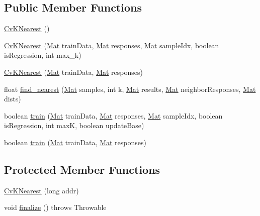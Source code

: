 \subsection*{Public Member Functions}
\begin{DoxyCompactItemize}
\item 
\mbox{\hyperlink{classorg_1_1opencv_1_1ml_1_1_cv_k_nearest_af6d22d07534fa138fbf3c2279bbe8300}{Cv\+K\+Nearest}} ()
\item 
\mbox{\hyperlink{classorg_1_1opencv_1_1ml_1_1_cv_k_nearest_aaf56327cf25a554fcabadbd32b5e5622}{Cv\+K\+Nearest}} (\mbox{\hyperlink{classorg_1_1opencv_1_1core_1_1_mat}{Mat}} train\+Data, \mbox{\hyperlink{classorg_1_1opencv_1_1core_1_1_mat}{Mat}} responses, \mbox{\hyperlink{classorg_1_1opencv_1_1core_1_1_mat}{Mat}} sample\+Idx, boolean is\+Regression, int max\+\_\+k)
\item 
\mbox{\hyperlink{classorg_1_1opencv_1_1ml_1_1_cv_k_nearest_a0971b80fa2de3df95ba0b87efd8dbb9a}{Cv\+K\+Nearest}} (\mbox{\hyperlink{classorg_1_1opencv_1_1core_1_1_mat}{Mat}} train\+Data, \mbox{\hyperlink{classorg_1_1opencv_1_1core_1_1_mat}{Mat}} responses)
\item 
float \mbox{\hyperlink{classorg_1_1opencv_1_1ml_1_1_cv_k_nearest_a43433439f169e81fb05a101e84e3ed57}{find\+\_\+nearest}} (\mbox{\hyperlink{classorg_1_1opencv_1_1core_1_1_mat}{Mat}} samples, int k, \mbox{\hyperlink{classorg_1_1opencv_1_1core_1_1_mat}{Mat}} results, \mbox{\hyperlink{classorg_1_1opencv_1_1core_1_1_mat}{Mat}} neighbor\+Responses, \mbox{\hyperlink{classorg_1_1opencv_1_1core_1_1_mat}{Mat}} dists)
\item 
boolean \mbox{\hyperlink{classorg_1_1opencv_1_1ml_1_1_cv_k_nearest_aeba1551faef0374791568c47fdb253ac}{train}} (\mbox{\hyperlink{classorg_1_1opencv_1_1core_1_1_mat}{Mat}} train\+Data, \mbox{\hyperlink{classorg_1_1opencv_1_1core_1_1_mat}{Mat}} responses, \mbox{\hyperlink{classorg_1_1opencv_1_1core_1_1_mat}{Mat}} sample\+Idx, boolean is\+Regression, int maxK, boolean update\+Base)
\item 
boolean \mbox{\hyperlink{classorg_1_1opencv_1_1ml_1_1_cv_k_nearest_a0d82009c9e1e9a4c327e354bca6a1347}{train}} (\mbox{\hyperlink{classorg_1_1opencv_1_1core_1_1_mat}{Mat}} train\+Data, \mbox{\hyperlink{classorg_1_1opencv_1_1core_1_1_mat}{Mat}} responses)
\end{DoxyCompactItemize}
\subsection*{Protected Member Functions}
\begin{DoxyCompactItemize}
\item 
\mbox{\hyperlink{classorg_1_1opencv_1_1ml_1_1_cv_k_nearest_a101ba1d24437af035d8fbb695256c16d}{Cv\+K\+Nearest}} (long addr)
\item 
void \mbox{\hyperlink{classorg_1_1opencv_1_1ml_1_1_cv_k_nearest_a11e3b4a4d8bfc437637fdd9ecb23ad55}{finalize}} ()  throws Throwable 
\end{DoxyCompactItemize}
